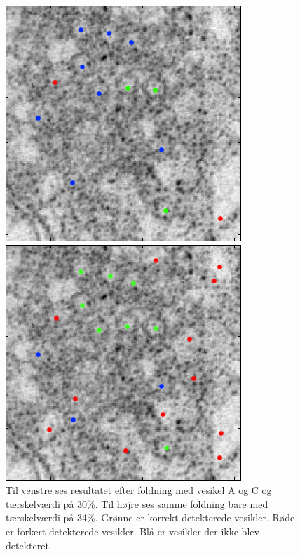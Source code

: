 \begin{figure}[H]
	\begin{minipage}[b]{0.5\linewidth}
		\includegraphics[scale=0.65]{files/postmethod/img/ves1+2_th-30_res2.png}
	\end{minipage}
	\hspace{0.5cm}
	\begin{minipage}[b]{0.5\linewidth}
		\includegraphics[scale=0.65]{files/postmethod/img/ves1+2_th-34_res2.png}
	\end{minipage}
	\caption{Til venstre ses resultatet efter foldning med vesikel A og C og tærskelværdi på 30\%. Til højre ses samme foldning bare med tærskelværdi på 34\%. Grønne er korrekt detekterede vesikler. Røde er forkert detekterede vesikler. Blå er vesikler der ikke blev detekteret.\label{fig:postmethod_conv_ves_1}}
\end{figure}

